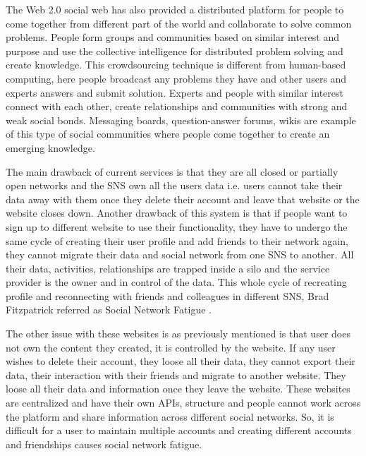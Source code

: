 The Web 2.0 social web has also provided a distributed platform for people to come together from different part of the world and collaborate to solve common problems. People form groups and communities based on similar interest and purpose and use the collective intelligence for distributed problem solving and create knowledge. This crowdsourcing technique is different from human-based computing, here people broadcast any problems they have and other users and experts answers and submit solution. Experts and people with similar interest connect with each other, create relationships and communities with strong and weak social bonds. Messaging boards, question-answer forums, wikis are example of this type of social communities where people come together to create an emerging knowledge.



The main drawback of current services is that they are all closed or partially open networks and the SNS own all the users data i.e. users cannot take their data away with them once they delete their account and leave that website or the website closes down. Another drawback of this system is that if people want to sign up to different website to use their functionality, they have to undergo the same cycle of creating their user profile and add friends to their network again, they cannot migrate their data and social network from one SNS to another. All their data, activities, relationships are trapped inside a silo and the service provider is the owner and in control of the data. This whole cycle of recreating profile and reconnecting with friends and colleagues in different SNS, Brad Fitzpatrick referred as Social Network Fatigue \cite{fitzpatrick2007}.


The other issue with these websites is as previously mentioned is that user does not own the content they created, it is controlled by the website. If any user wishes to delete their account, they loose all their data, they cannot export their data, their interaction with their friends and migrate to another website. They loose all their data and information once they leave the website. These websites are centralized and have their own APIs, structure and people cannot work across the platform and share information across different social networks. So, it is difficult for a user to maintain multiple accounts and creating different accounts and friendships causes social network fatigue.


